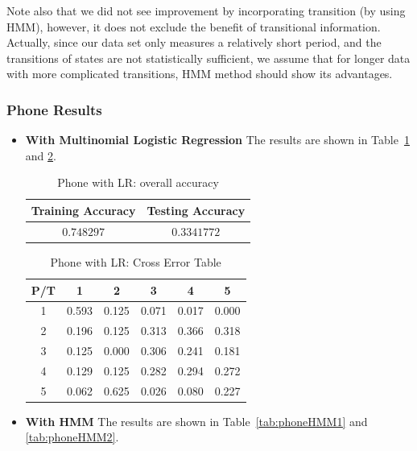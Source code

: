 Note also that we did not see improvement by incorporating transition (by using HMM), however, it does not exclude the benefit of transitional information. Actually, since our data set only measures a relatively short period, and the transitions of states are not statistically sufficient, we assume that for longer data with more complicated transitions, HMM method should show its advantages. 

\subsubsection{Phone Results} 
\label{subsec:phoneresult}
\begin{itemize}

\item \textbf{With Multinomial Logistic Regression} 
The results are shown in Table~\ref{tab:phoneLR1} and \ref{tab:phoneLR2}.

\begin{table}[!htb]
\begin{center}
\begin{tabular}{c|c}
      \hline
      Training Accuracy & Testing Accuracy\\
      \hline
      $0.748297$ & $0.3341772$ \\
      \hline
\end{tabular}
\caption{Phone with LR: overall accuracy}
\label{tab:phoneLR1}
\end{center}
\end{table}

\begin{table}[!htb]
\begin{center}
\begin{tabular}{c|c|c|c|c|c}
      \hline
      P/T& 1 & 2 &3 & 4 & 5 \\
      \hline
      1 &0.593&0.125&0.071&0.017&0.000\\
      2 &0.196&0.125&0.313&0.366&0.318\\
      3 &0.125&0.000&0.306&0.241&0.181\\
      4 &0.129&0.125&0.282&0.294&0.272\\
      5 &0.062&0.625&0.026&0.080&0.227\\
      \hline
\end{tabular}
\caption{Phone with LR: Cross Error Table}
\label{tab:phoneLR2}
\end{center}
\end{table}

\item \textbf{With HMM}
The results are shown in Table~\ref{tab:phoneHMM1} and \ref{tab:phoneHMM2}.


\end{itemize}
